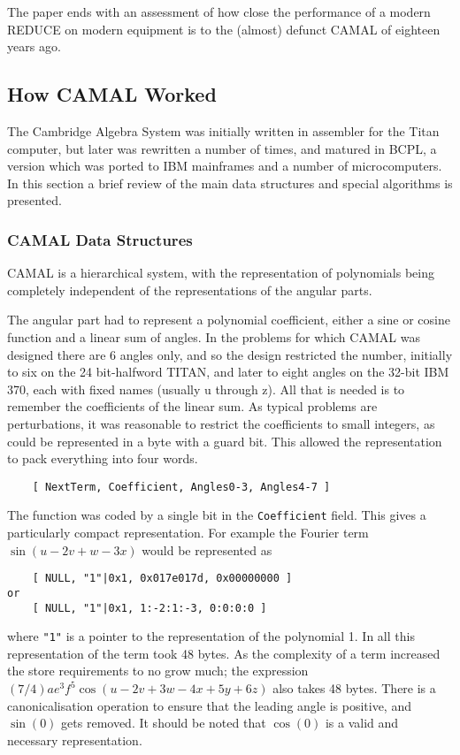 The paper ends with an assessment of how close the performance of a
modern REDUCE on modern equipment is to the (almost) defunct CAMAL of
eighteen years ago.

\subsection{How CAMAL Worked}

The Cambridge Algebra System was initially written in assembler for
the Titan computer, but later was rewritten a number of times, and
matured in BCPL, a version which was ported to IBM mainframes and a
number of microcomputers.  In this section a brief review of the main
data structures and special algorithms is presented.

\subsubsection{CAMAL Data Structures}

CAMAL is a hierarchical system, with the representation of polynomials
being completely independent of the representations of the angular
parts.

The angular part had to represent a polynomial coefficient, either a
sine or cosine function and a linear sum of angles.  In the problems
for which CAMAL was designed there are 6 angles only, and so the
design restricted the number, initially to six on the 24 bit-halfword
TITAN, and later to eight angles on the 32-bit IBM 370, each with
fixed names (usually u through z).  All that is needed is to remember
the coefficients of the linear sum.  As typical problems are
perturbations, it was reasonable to restrict the coefficients to small
integers, as could be represented in a byte with a guard bit.  This
allowed the representation to pack everything into four words.
\begin{verbatim}
    [ NextTerm, Coefficient, Angles0-3, Angles4-7 ]
\end{verbatim}
The function was coded by a single bit in the {\tt Coefficient} field.  This
gives a particularly compact representation.  For example the Fourier
term $\sin(u-2v+w-3x)$ would be represented as
\begin{verbatim}
    [ NULL, "1"|0x1, 0x017e017d, 0x00000000 ]
or
    [ NULL, "1"|0x1, 1:-2:1:-3, 0:0:0:0 ]
\end{verbatim}
where \texttt{"1"} is a pointer to the representation of the polynomial
1.  In all this representation of the term took 48 bytes.  As the
complexity of a term increased the store requirements to no grow much;
the expression $(7/4) a e^3 f^5 \cos(u-2v+3w-4x+5y+6z)$ also takes 48
bytes.  There is a canonicalisation operation to ensure that the
leading angle is positive, and $\sin(0)$ gets removed.  It should be
noted that $\cos(0)$ is a valid and necessary representation.

